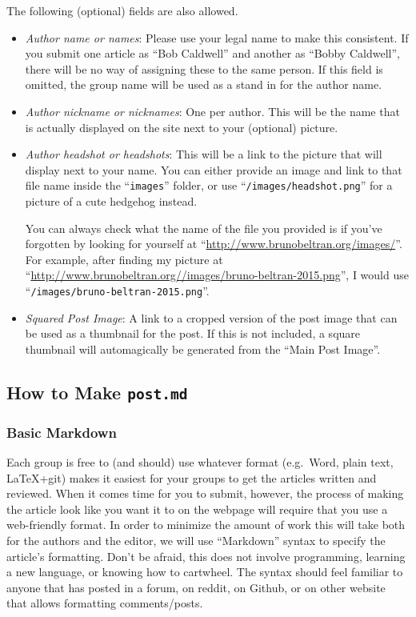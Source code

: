 \documentclass[paper=a4, fontsize=11pt]{scrartcl}
\numberwithin{equation}{section}        %
\numberwithin{figure}{section}            %
\numberwithin{table}{section}                %
\newcommand{\dishurl}[1]{\url{http://www.brunobeltran.org/#1}}
\begin{document}
\noindent{}The following (optional) fields are also allowed.
\begin{itemize}
    \item \emph{Author name or names}: Please use your legal name to make this consistent. If
        you submit one article as ``Bob Caldwell'' and another as ``Bobby
        Caldwell'', there will be no way of assigning these to the same person.
        If this field is omitted, the group name will be used as a stand in for
        the author name.
    \item \emph{Author nickname or nicknames}: One per author. This will be the name that is
        actually displayed on the site next to your (optional) picture.
    \item \emph{Author headshot or headshots}: This will be a link to the picture that will
        display next to your name. You can either provide an image and link to
        that file name inside the ``\texttt{images}'' folder, or use
        ``\texttt{/images/headshot.png}'' for a picture of a cute hedgehog instead.

        You can always check what the name of the file you provided is if you've
        forgotten by looking for yourself at ``\dishurl{images/}''.
        For example, after finding my picture at
        ``\dishurl{/images/bruno-beltran-2015.png}'', I would use
        ``\texttt{/images/bruno-beltran-2015.png}''.
    \item \emph{Squared Post Image}: A link to a cropped version of the post image that
        can be used as a thumbnail for the post. If this is not included, a
        square thumbnail will automagically be generated from the ``Main Post Image''.
\end{itemize}


\subsection{How to Make \texttt{\textbf{post.md}}}

\subsubsection{Basic Markdown}

Each group is free to (and should) use whatever format (e.g.\ Word, plain text,
LaTeX+git) makes it easiest for your groups to get the articles written and
reviewed. When it comes time for you to submit, however, the process of making
the article look like you want it to on the webpage will require that you use a web-friendly
format. In order to minimize the amount of work this will take both for the
authors and the editor, we will use ``Markdown'' syntax to specify the article's
formatting. Don't be afraid, this does not involve programming, learning a new
language, or knowing how to cartwheel. The syntax should feel familiar to anyone
that has posted in a forum, on reddit, on Github, or on other website that allows
formatting comments/posts.
\end{document}
